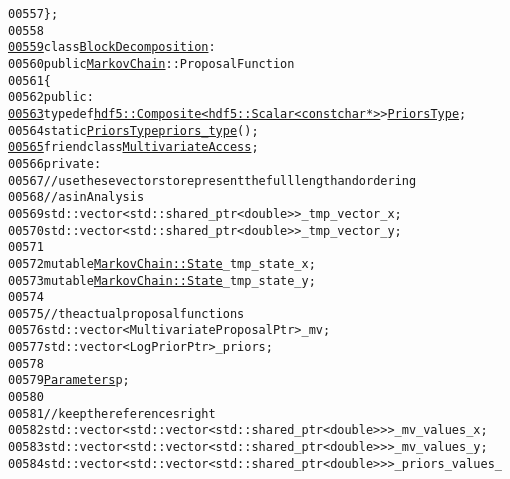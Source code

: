 \begin{footnotesize}
\begin{alltt}
00557         \};
00558 
\hypertarget{proposal__functions_8hh_source_l00559}{}\hyperlink{classeos_1_1proposal__functions_1_1BlockDecomposition}{00559}         \textcolor{keyword}{class }\hyperlink{classeos_1_1proposal__functions_1_1BlockDecomposition}{BlockDecomposition} :
00560             \textcolor{keyword}{public} \hyperlink{classeos_1_1MarkovChain}{MarkovChain}::ProposalFunction
00561         \{
00562             \textcolor{keyword}{public}:
\hypertarget{proposal__functions_8hh_source_l00563}{}\hyperlink{classeos_1_1proposal__functions_1_1BlockDecomposition_a892047be5924542e4defaa86b30ad6fd}{00563}                 \textcolor{keyword}{typedef} \hyperlink{classeos_1_1hdf5_1_1Composite}{hdf5::Composite<hdf5::Scalar<const char *>}> \hyperlink{classeos_1_1hdf5_1_1Composite}{PriorsType};
00564                 \textcolor{keyword}{static} \hyperlink{classeos_1_1hdf5_1_1Composite}{PriorsType} \hyperlink{classeos_1_1proposal__functions_1_1BlockDecomposition_a1dc4342c37838cf8d87f5c64c2f02f66}{priors_type}();
\hypertarget{proposal__functions_8hh_source_l00565}{}\hyperlink{classeos_1_1proposal__functions_1_1BlockDecomposition_a52a0d4a7b6284023493999008d416bfe}{00565}                 \textcolor{keyword}{friend} \textcolor{keyword}{class }\hyperlink{structeos_1_1proposal__functions_1_1MultivariateAccess}{MultivariateAccess};
00566             \textcolor{keyword}{private}:
00567                 \textcolor{comment}{// use these vectors to represent the full length and ordering}
00568                 \textcolor{comment}{// as in Analysis}
00569                 std::vector<std::shared\_ptr<double> > \_tmp\_vector\_x;
00570                 std::vector<std::shared\_ptr<double> > \_tmp\_vector\_y;
00571 
00572                 \textcolor{keyword}{mutable} \hyperlink{structeos_1_1MarkovChain_1_1State}{MarkovChain::State} \_tmp\_state\_x;
00573                 \textcolor{keyword}{mutable} \hyperlink{structeos_1_1MarkovChain_1_1State}{MarkovChain::State} \_tmp\_state\_y;
00574 
00575                 \textcolor{comment}{// the actual proposal functions}
00576                 std::vector<MultivariateProposalPtr> \_mv;
00577                 std::vector<LogPriorPtr> \_priors;
00578 
00579                 \hyperlink{classeos_1_1Parameters}{Parameters} p;
00580 
00581                 \textcolor{comment}{// keep the references right}
00582                 std::vector<std::vector<std::shared\_ptr<double>>> \_mv\_values\_x;
00583                 std::vector<std::vector<std::shared\_ptr<double>>> \_mv\_values\_y;
00584                 std::vector<std::vector<std::shared\_ptr<double>>> \_priors\_values\_

\end{alltt}
\end{footnotesize}
